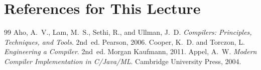\documentclass[full-course-notes.tex]{subfiles}
\begin{document}
\section*{References for This Lecture}
\begin{thebibliography}{99}
 Aho, A.~V., Lam, M.~S., Sethi, R., and Ullman, J.~D. \textit{Compilers:
Principles, Techniques, and Tools}. 2nd~ed. Pearson, 2006.
 Cooper, K.~D. and Torczon, L. \textit{Engineering a Compiler}. 2nd~ed. Morgan
Kaufmann, 2011.
 Appel, A.~W. \textit{Modern Compiler Implementation in C/Java/ML}. Cambridge
University Press, 2004.
\end{thebibliography}
\end{document}
